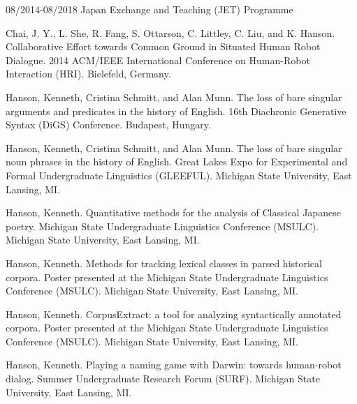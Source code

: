 \documentclass[10pt,oneside]{article}
\begin{document}

\begin{reslist}
		{08/2014-08/2018}
		{Japan Exchange and Teaching (JET) Programme}
		{}
\end{reslist}



\begin{publist}
	\item[2014] {Chai, J. Y., L. She, R. Fang, S. Ottarson, C. Littley, C. Liu, and K. Hanson. Collaborative Effort towards Common Ground in Situated Human Robot Dialogue. 2014 ACM/IEEE International Conference on Human-Robot Interaction (HRI). Bielefeld, Germany.}
\end{publist}



\begin{publist}
	\item[2014] {Hanson, Kenneth, Cristina Schmitt, and Alan Munn. The loss of bare singular arguments and predicates in the history of English. 16th Diachronic Generative Syntax (DiGS) Conference. Budapest, Hungary.}
\end{publist}

\begin{publist}
	\item[2014] {Hanson, Kenneth, Cristina Schmitt, and Alan Munn. The loss of bare singular noun phrases in the history of English. Great Lakes Expo for Experimental and Formal Undergraduate Linguistics (GLEEFUL). Michigan State University, East Lansing, MI.}
\end{publist}

\begin{publist}
	\item[2014] {Hanson, Kenneth. Quantitative methods for the analysis of Classical Japanese poetry. Michigan State Undergraduate Linguistics Conference (MSULC). Michigan State University, East Lansing, MI.}
	
	\item[2014] {Hanson, Kenneth. Methods for tracking lexical classes in parsed historical corpora. Poster presented at the Michigan State Undergraduate Linguistics Conference (MSULC). Michigan State University, East Lansing, MI.}
	
	\item[2013] {Hanson, Kenneth. CorpusExtract: a tool for analyzing syntactically annotated corpora. Poster presented at the Michigan State Undergraduate Linguistics Conference (MSULC). Michigan State University, East Lansing, MI.}
	
	\item[2012] {Hanson, Kenneth. Playing a naming game with Darwin: towards human-robot dialog. Summer Undergraduate Research Forum (SURF). Michigan State University, East Lansing, MI.}
\end{publist}
\end{document}
